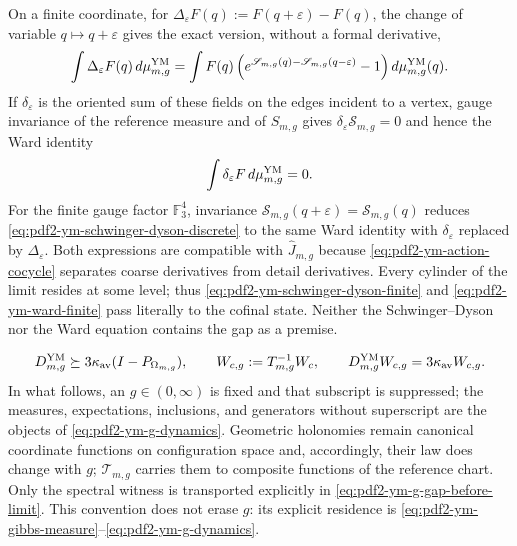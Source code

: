 On a finite coordinate, for
$\Delta_\varepsilon F(q):=F(q+\varepsilon)-F(q)$, the change of variable
$q\mapsto q+\varepsilon$ gives the exact version, without a formal derivative,
\begin{equation}\label{eq:pdf2-ym-schwinger-dyson-discrete}
 \int\Delta_\varepsilon F(q)\,d\widehat\mu_{m,g}^{\rm YM}
 =\int F(q)
  \left(e^{\mathscr S_{m,g}(q)-\mathscr S_{m,g}(q-\varepsilon)}-1\right)
  d\widehat\mu_{m,g}^{\rm YM}(q).
\end{equation}
If $\delta_\varepsilon$ is the oriented sum of these fields on the edges
incident to a vertex, gauge invariance of the reference measure and of
$S_{m,g}$ gives $\delta_\varepsilon\mathscr S_{m,g}=0$ and hence the Ward identity
\begin{equation}\label{eq:pdf2-ym-ward-finite}
 \int\delta_\varepsilon F\,d\widehat\mu_{m,g}^{\rm YM}=0.
\end{equation}
For the finite gauge factor $\mathbb F_3^4$, invariance
$\mathscr S_{m,g}(q+\varepsilon)=\mathscr S_{m,g}(q)$ reduces
\eqref{eq:pdf2-ym-schwinger-dyson-discrete} to the same Ward identity with
$\delta_\varepsilon$ replaced by $\Delta_\varepsilon$.
Both expressions are compatible with $\widehat J_{m,g}$ because
\eqref{eq:pdf2-ym-action-cocycle} separates coarse derivatives from detail derivatives.
Every cylinder of the limit resides at some level; thus
\eqref{eq:pdf2-ym-schwinger-dyson-finite} and
\eqref{eq:pdf2-ym-ward-finite} pass literally to the cofinal state. Neither the
Schwinger--Dyson nor the Ward equation contains the gap as a premise.

\begin{equation}\label{eq:pdf2-ym-g-gap-before-limit}
 D_{m,g}^{\rm YM}\succeq3\kappa_{\rm av}
 (I-P_{\Omega_{m,g}}),
 \qquad
 W_{c,g}:=\mathcal T_{m,g}^{-1}W_c,
 \qquad
 D_{m,g}^{\rm YM}W_{c,g}=3\kappa_{\rm av}W_{c,g}.
\end{equation}
In what follows, an $g\in(0,\infty)$ is fixed and that subscript is suppressed; the
measures, expectations, inclusions, and generators without superscript are the objects
of \eqref{eq:pdf2-ym-g-dynamics}. Geometric holonomies remain canonical coordinate
functions on configuration space and, accordingly, their
law does change with $g$; $\mathcal T_{m,g}$ carries them to composite functions of the
reference chart. Only the spectral witness is transported explicitly in
\eqref{eq:pdf2-ym-g-gap-before-limit}. This convention does not erase $g$: its explicit residence is
\eqref{eq:pdf2-ym-gibbs-measure}--\eqref{eq:pdf2-ym-g-dynamics}.

